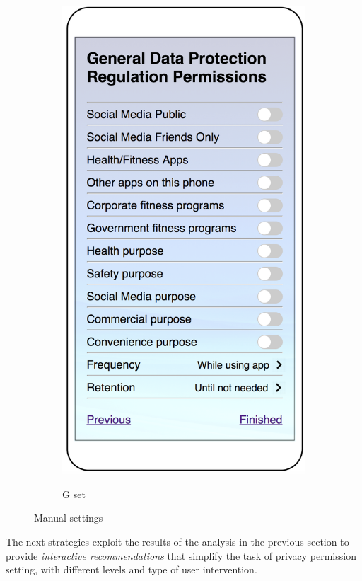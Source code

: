 \begin{figure}
\begin{subfigure}[b]{0.24\textheight}
		\includegraphics[width=0.24\textheight]{figures/manual4.png}
		\label{fig:manuald}
		\caption{G set}
	\end{subfigure}
	\caption{Manual settings}
	\label{fig:manual}
\end{figure}

The next strategies exploit the results of the analysis in the previous section to provide \textit{interactive recommendations} that simplify the task of privacy permission setting, with different levels and type of user intervention.

